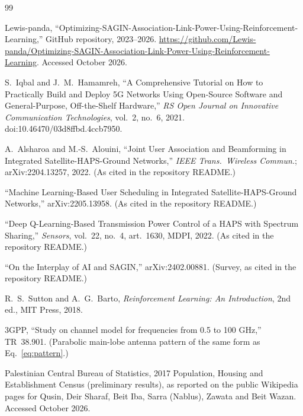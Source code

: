 \documentclass[11pt,a4paper]{article}
\begin{document}
\begin{thebibliography}{99}\small

 Lewis-panda, ``Optimizing-SAGIN-Association-Link-Power-Using-Reinforcement-Learning,'' GitHub repository, 2023--2026. \url{https://github.com/Lewis-panda/Optimizing-SAGIN-Association-Link-Power-Using-Reinforcement-Learning}. Accessed October 2026.

 S.~Iqbal and J.~M.~Hamamreh, ``A Comprehensive Tutorial on How to Practically Build and Deploy 5G Networks Using Open-Source Software and General-Purpose, Off-the-Shelf Hardware,'' \emph{RS Open Journal on Innovative Communication Technologies}, vol.~2, no.~6, 2021. doi:10.46470/03d8ffbd.4ccb7950.

 A.~Alsharoa and M.-S.~Alouini, ``Joint User Association and Beamforming in Integrated Satellite-HAPS-Ground Networks,'' \emph{IEEE Trans.\ Wireless Commun.}; arXiv:2204.13257, 2022. (As cited in the repository README.)

 ``Machine Learning-Based User Scheduling in Integrated Satellite-HAPS-Ground Networks,'' arXiv:2205.13958. (As cited in the repository README.)

 ``Deep Q-Learning-Based Transmission Power Control of a HAPS with Spectrum Sharing,'' \emph{Sensors}, vol.~22, no.~4, art.~1630, MDPI, 2022. (As cited in the repository README.)

 ``On the Interplay of AI and SAGIN,'' arXiv:2402.00881. (Survey, as cited in the repository README.)

 R.~S.~Sutton and A.~G.~Barto, \emph{Reinforcement Learning: An Introduction}, 2nd ed., MIT Press, 2018.

 3GPP, ``Study on channel model for frequencies from 0.5 to 100 GHz,'' TR~38.901. (Parabolic main-lobe antenna pattern of the same form as Eq.~\eqref{eq:pattern}.)

 Palestinian Central Bureau of Statistics, 2017 Population, Housing and Establishment Census (preliminary results), as reported on the public Wikipedia pages for Qusin, Deir Sharaf, Beit Iba, Sarra (Nablus), Zawata and Beit Wazan. Accessed October 2026.

\end{thebibliography}
\end{document}
